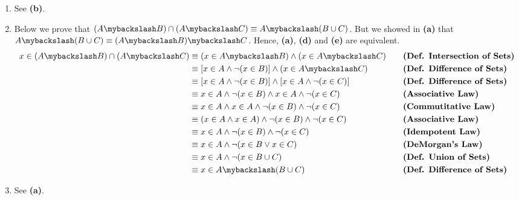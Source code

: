 \begin{enumerate}[label=(\alph*)]
    \item See \textbf{(b)}.
    \pagebreak
    
    \item Below we prove that $(A \mybackslash B) \cap (A \mybackslash C) \equiv A \mybackslash (B \cup C)$. But we showed in \textbf{(a)} that $A \mybackslash (B \cup C) \equiv (A \mybackslash B) \mybackslash C$. Hence, \textbf{(a)}, \textbf{(d)} and \textbf{(e)} are equivalent.
    \begin{alignat*}{2}
        x \in (A \mybackslash B) \cap (A \mybackslash C) &\equiv (x \in A \mybackslash B) \wedge (x \in A \mybackslash C) && \quad \textbf{(Def. Intersection of Sets)}\\
        &\equiv [x \in A \wedge \neg (x \in B)] \wedge (x \in A \mybackslash C) && \quad \textbf{(Def. Difference of Sets)}\\
        &\equiv [x \in A \wedge \neg (x \in B)] \wedge [x \in A \wedge \neg (x \in C)] && \quad \textbf{(Def. Difference of Sets)}\\
        &\equiv x \in A \wedge \neg (x \in B) \wedge x \in A \wedge \neg (x \in C) && \quad \textbf{(Associative Law)}\\
        &\equiv x \in A \wedge x \in A \wedge \neg (x \in B) \wedge \neg (x \in C) && \quad \textbf{(Commutitative Law)}\\
        &\equiv (x \in A \wedge x \in A) \wedge \neg (x \in B) \wedge \neg (x \in C) && \quad \textbf{(Associative Law)}\\
        &\equiv x \in A \wedge \neg (x \in B) \wedge \neg (x \in C) && \quad \textbf{(Idempotent Law)}\\
        &\equiv x \in A \wedge \neg (x \in B \vee x \in C) && \quad \textbf{(DeMorgan's Law)}\\
        &\equiv x \in A \wedge \neg (x \in B \cup C) && \quad \textbf{(Def. Union of Sets)}\\
        &\equiv x \in A \mybackslash (B \cup C) && \quad \textbf{(Def. Difference of Sets)}\\
    \end{alignat*}
    
    \item See \textbf{(a)}.
\end{enumerate}
\pagebreak